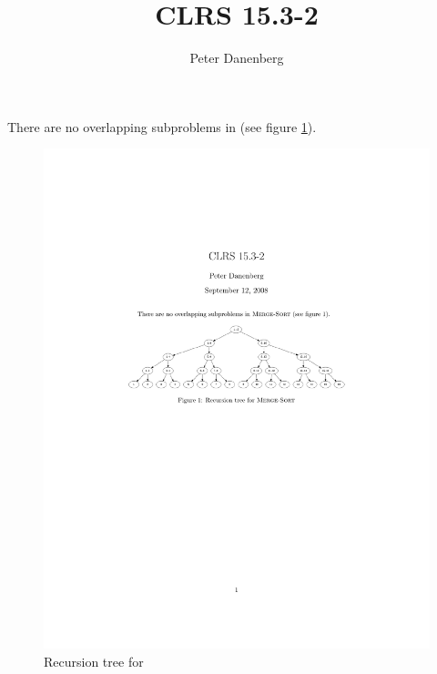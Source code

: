 \documentclass{article}
\title{CLRS 15.3-2}
\author{Peter Danenberg}
\begin{document}
\maketitle 

There are no overlapping subproblems in  (see figure
\ref{fig:merge-sort}).

\begin{figure}[ht]
  \centering
  \includegraphics[width=\linewidth]{15.3-2}
  \caption{Recursion tree for }
  \label{fig:merge-sort}
\end{figure}
\end{document}
